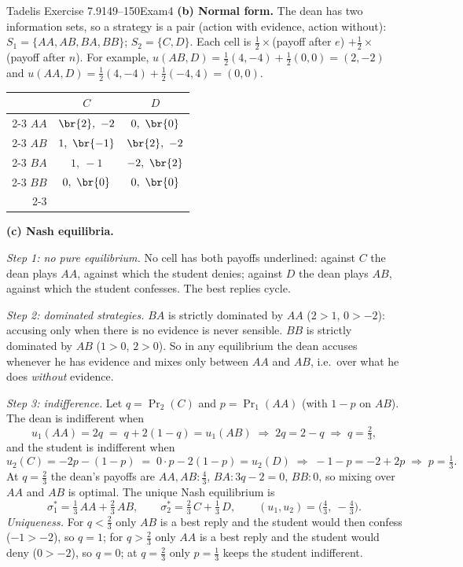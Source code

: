 \begin{exsol}{Tadelis Exercise 7.9}{149--150}{Exam}{4}
\textbf{(b) Normal form.} The dean has two information sets, so a strategy is a pair
(action with evidence, action without): $S_1 = \{AA, AB, BA, BB\}$; $S_2 = \{C, D\}$. Each cell
is $\frac12 \times$(payoff after $e$) $+ \frac12 \times$(payoff after $n$). For example,
$u(AB, D) = \frac12(4,-4) + \frac12(0,0) = (2,-2)$ and $u(AA, D) = \frac12(4,-4) + \frac12(-4,4) =
(0,0)$.
\begin{center}
\begin{tabular}{r|c|c|}
\multicolumn{1}{r}{} & \multicolumn{1}{c}{$C$} & \multicolumn{1}{c}{$D$}\\ \cline{2-3}
$AA$ & $\br{2},\ -2$ & $0,\ \br{0}$ \\ \cline{2-3}
$AB$ & $1,\ \br{-1}$ & $\br{2},\ -2$ \\ \cline{2-3}
$BA$ & $1,\ -1$ & $-2,\ \br{2}$ \\ \cline{2-3}
$BB$ & $0,\ \br{0}$ & $0,\ \br{0}$ \\ \cline{2-3}
\end{tabular}
\end{center}

\textbf{(c) Nash equilibria.}

\emph{Step 1: no pure equilibrium.} No cell has both payoffs underlined: against $C$ the dean
plays $AA$, against which the student denies; against $D$ the dean plays $AB$, against which the
student confesses. The best replies cycle.

\emph{Step 2: dominated strategies.} $BA$ is strictly dominated by $AA$ ($2 > 1$, $0 > -2$):
accusing only when there is no evidence is never sensible. $BB$ is strictly dominated by $AB$
($1 > 0$, $2 > 0$). So in any equilibrium the dean accuses whenever he has evidence and mixes only
between $AA$ and $AB$, i.e.\ over what he does \emph{without} evidence.

\emph{Step 3: indifference.} Let $q = \Pr_2(C)$ and $p = \Pr_1(AA)$ (with $1-p$ on $AB$). The dean
is indifferent when
\begin{equation}
  u_1(AA) = 2q \;=\; q + 2(1-q) = u_1(AB) \;\Rightarrow\; 2q = 2 - q \;\Rightarrow\; q = \tfrac23 ,
  \label{eq:tadelis-7-9-q}
\end{equation}
and the student is indifferent when
\begin{equation}
  u_2(C) = -2p - (1-p) \;=\; 0\cdot p - 2(1-p) = u_2(D) \;\Rightarrow\; -1 - p = -2 + 2p
  \;\Rightarrow\; p = \tfrac13 . \label{eq:tadelis-7-9-p}
\end{equation}
At $q = \frac23$ the dean's payoffs are $AA, AB: \frac43$, $BA: 3q - 2 = 0$, $BB: 0$, so mixing
over $AA$ and $AB$ is optimal. The unique Nash equilibrium is
\[
  \sigma_1^* = \tfrac13\,AA + \tfrac23\,AB, \qquad \sigma_2^* = \tfrac23\,C + \tfrac13\,D,
  \qquad (u_1, u_2) = \bigl(\tfrac43,\ -\tfrac43\bigr).
\]
\emph{Uniqueness.} For $q < \frac23$ only $AB$ is a best reply and the student would then confess
($-1 > -2$), so $q = 1$; for $q > \frac23$ only $AA$ is a best reply and the student would deny
($0 > -2$), so $q = 0$; at $q = \frac23$ only $p = \frac13$ keeps the student indifferent.


\end{exsol}
